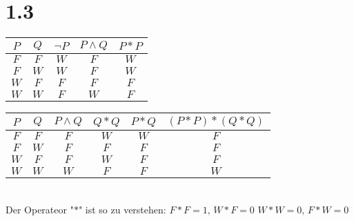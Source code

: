 \documentclass[titlepage]{article}
\newcommand{\n}{\newline}
\begin{document}
		\newpage
		\section*{1.3}
		\begin{table}[h]
			\begin{tabular}{cc|ccc}
				$P$&$Q$&$\neg P$&$P\wedge Q$&$P*P$ \\\hline
				$F$&$F$&$W$&$F$&$W$ \\
				$F$&$W$&$W$&$F$&$W$ \\
				$W$&$F$&$F$&$F$&$F$ \\
				$W$&$W$&$F$&$W$&$F$ \\
			\end{tabular}
			\n \n \n
			\begin{tabular}{cc|cccc}
				$P$&$Q$&$P\wedge Q$&$Q*Q$&$P*Q$&$(P*P)*(Q*Q)$ \\\hline
				$F$&$F$&$F$&$W$&$W$&$F$ \\
				$F$&$W$&$F$&$F$&$F$&$F$ \\
				$W$&$F$&$F$&$W$&$F$&$F$ \\
				$W$&$W$&$W$&$F$&$F$&$W$ \\
			\end{tabular}
			\\ \n \n \n \hspace*{10mm}
			Der Operateor "$*$" ist so zu verstehen:
			\n \n \hspace*{20mm}
			$F*F = 1,\, W*F = 0$ \n \n \hspace*{20mm}
			$W*W = 0,\, F*W = 0$
		\end{table}
\end{document}
